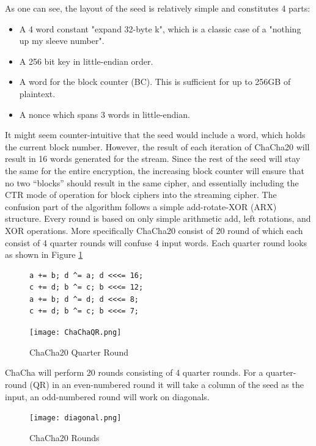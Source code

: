\documentclass[a4paper, openany]{memoir}
\begin{document}
\begin{abstact}
As one can see, the layout of the seed is relatively simple and constitutes 4 parts:
\begin{itemize}
\itemsep 0em
\item A 4 word constant "expand 32-byte k", which is a classic case of a "nothing up my sleeve number".
\item A 256 bit key in little-endian order.
\item A word for the block counter (BC). This is sufficient for up to 256GB of plaintext.
\item A nonce which spans 3 words in little-endian.
\end{itemize}
It might seem counter-intuitive that the seed would include a word, which holds the current block number. However, the result of each iteration of ChaCha20 will result in 16 words generated for the stream. Since the rest of the seed will stay the same for the entire encryption, the increasing block counter will ensure that no two ``blocks'' should result in the same cipher, and essentially including the CTR mode of operation for block ciphers into the streaming cipher. The confusion part of the algorithm follows a simple add-rotate-XOR (ARX) structure. Every round is based on only simple arithmetic add, left rotations, and XOR operations. More specifically ChaCha20 consist of 20 round of which each consist of 4 quarter rounds will confuse 4 input words. Each quarter round looks as shown in Figure \ref{fig:ChaChaQR}
\begin{figure}[H]
\begin{minipage}{0.4\textwidth}
\begin{verbatim}
a += b; d ^= a; d <<<= 16;
c += d; b ^= c; b <<<= 12;
a += b; d ^= d; d <<<= 8;
c += d; b ^= c; b <<<= 7;
\end{verbatim}
\end{minipage}
\qquad
\begin{minipage}{0.4\textwidth}
\texttt{[image: ChaChaQR.png]}
\end{minipage}
\caption{ChaCha20 Quarter Round}
\label{fig:ChaChaQR}
\end{figure}
ChaCha will perform 20 rounds consisting of 4 quarter rounds. For a quarter-round (QR) in an even-numbered round it will take a column of the seed as the input, an odd-numbered round will work on diagonals.
\begin{figure}[H]
\centering
\texttt{[image: diagonal.png]}
\caption{ChaCha20 Rounds}
\label{fig:ChaChaRound}
\end{figure}


\end{abstact}
\end{document}
